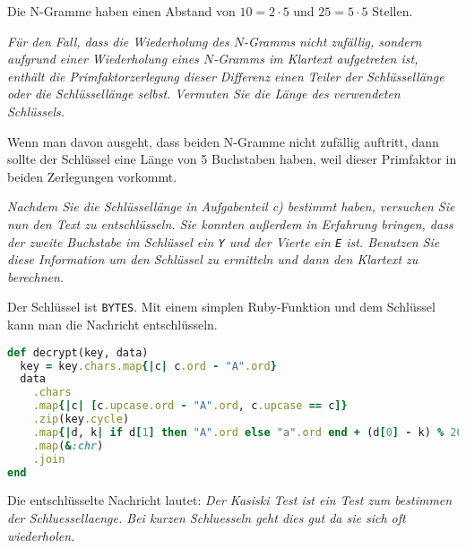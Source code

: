 \documentclass[
  ngerman,
  DIV=12
]{scrartcl}
\begin{document}
\medskip\noindent
Die N-Gramme haben einen Abstand von $10 = 2 \cdot 5$ und $25 = 5 \cdot 5$ Stellen. 

\bigskip\noindent
\emph{Für den Fall, dass die Wiederholung des $N$-Gramms nicht zufällig, sondern aufgrund einer Wiederholung eines $N$-Gramms im Klartext aufgetreten ist, enthält die Primfaktorzerlegung dieser Differenz einen Teiler der Schlüssellänge oder die Schlüssellänge selbst. Vermuten Sie die Länge des verwendeten Schlüssels.}

\medskip\noindent
Wenn man davon ausgeht, dass beiden N-Gramme nicht zufällig auftritt, dann sollte der Schlüssel eine Länge von 5 Buchstaben haben, weil dieser Primfaktor in beiden Zerlegungen vorkommt.

\bigskip\noindent
\emph{Nachdem Sie die Schlüssellänge in Aufgabenteil c) bestimmt haben, versuchen Sie nun den Text zu entschlüsseln. Sie konnten außerdem in Erfahrung bringen, dass der zweite Buchstabe im Schlüssel ein \texttt{Y} und der Vierte ein \texttt{E} ist. Benutzen Sie diese Information um den Schlüssel zu ermitteln und dann den Klartext zu berechnen.}

\medskip\noindent
Der Schlüssel ist \texttt{BYTES}. Mit einem simplen Ruby-Funktion und dem Schlüssel kann man die Nachricht entschlüsseln.
\begin{lstlisting}[language=Ruby]
def decrypt(key, data)
  key = key.chars.map{|c| c.ord - "A".ord}
  data
    .chars
    .map{|c| [c.upcase.ord - "A".ord, c.upcase == c]}
    .zip(key.cycle)
    .map{|d, k| if d[1] then "A".ord else "a".ord end + (d[0] - k) % 26}
    .map(&:chr)
    .join
end
\end{lstlisting}
Die entschlüsselte Nachricht lautet: \emph{Der Kasiski Test ist ein Test zum bestimmen der Schluessellaenge. Bei kurzen Schluesseln geht dies gut da sie sich oft wiederholen.}
\end{document}
